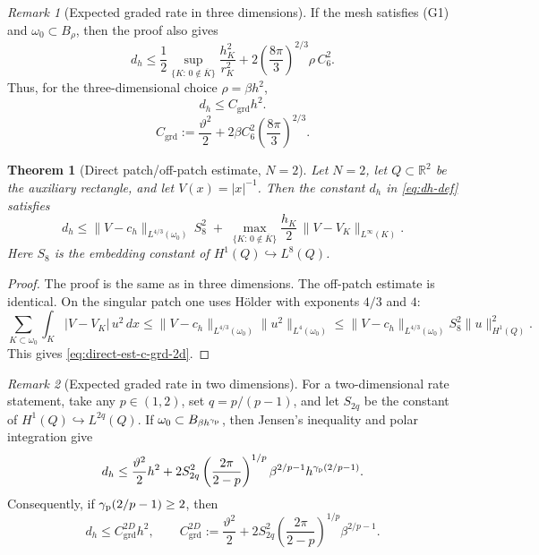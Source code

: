 \documentclass[11pt]{article}
\theoremstyle{plain}
\newtheorem{theorem}{Theorem}
\theoremstyle{definition}
\theoremstyle{remark}
\newtheorem{remark}{Remark}
\begin{document}
\begin{remark}[Expected graded rate in three dimensions]
If the mesh satisfies (G1) and
\(\omega_0\subset B_\rho\), then the proof also gives
\begin{equation}
\label{eq:middle-way}
  d_h
  \le
  \frac12\sup_{\{K:\,0\notin\overline K\}}\frac{h_K^2}{r_K^2}
  +2\left(\frac{8\pi}{3}\right)^{2/3}\rho\,C_6^2 .
\end{equation}
Thus, for the three-dimensional choice \(\rho=\beta h^2\),
\begin{equation}
\label{eq:graded-eps-3d}
  d_h\le C_{\mathrm{grd}}h^2.
\end{equation}
\begin{equation}
\label{eq:Cgrd-3d}
  C_{\mathrm{grd}}
  :=
  \frac{\vartheta^2}{2}
  +2\beta C_6^2\left(\frac{8\pi}{3}\right)^{2/3}.
\end{equation}
\end{remark}

\begin{theorem}[Direct patch/off-patch estimate, $N=2$]
\label{thm:graded-eps-2d}
Let $N=2$, let $Q\subset \mathbb R^2$ be the auxiliary rectangle, and let
$V(x)=|x|^{-1}$. Then the constant $d_h$ in \eqref{eq:dh-def} satisfies
\begin{equation}
d_h
\le
\|V-c_h\|_{L^{4/3}(\omega_0)}\,S_8^2
\;+\;
\max_{\{K:\,0\notin \overline K\}}
\frac{h_K}{2}\,\|V-V_K\|_{L^\infty(K)}.
\label{eq:direct-est-c-grd-2d}
\end{equation}
Here $S_8$ is the embedding constant of
$H^1(Q)\hookrightarrow L^8(Q)$.
\end{theorem}

\begin{proof}
The proof is the same as in three dimensions. The off-patch estimate is
identical. On the singular patch one uses Hölder with exponents
$4/3$ and $4$:
\[
\sum_{K\subset \omega_0}\int_K |V-V_K|\,u^2\,dx
\le
\|V-c_h\|_{L^{4/3}(\omega_0)} \|u^2\|_{L^4(\omega_0)}
\le
\|V-c_h\|_{L^{4/3}(\omega_0)} S_8^2 \|u\|_{H^1(Q)}^2.
\]
This gives \eqref{eq:direct-est-c-grd-2d}.
\end{proof}

\begin{remark}[Expected graded rate in two dimensions]
For a two-dimensional rate statement, take any \(p\in(1,2)\), set
\(q=p/(p-1)\), and let \(S_{2q}\) be the constant of
\(H^1(Q)\hookrightarrow L^{2q}(Q)\).  If
\(\omega_0\subset B_{\beta h^{\gamma_{\rm p}}}\), then Jensen's inequality and
polar integration give
\begin{equation}
\label{eq:graded-eps-2d}
  d_h
  \le
  \frac{\vartheta^2}{2}h^2
  +2S_{2q}^2
  \left(\frac{2\pi}{2-p}\right)^{1/p}
  \beta^{2/p-1}h^{\gamma_{\rm p}(2/p-1)}.
\end{equation}
Consequently, if \(\gamma_{\rm p}(2/p-1)\ge2\), then
\begin{equation}
\label{eq:Cgrd-2d}
  d_h\le C_{\mathrm{grd}}^{2D}h^2,
  \qquad
  C_{\mathrm{grd}}^{2D}
  :=
  \frac{\vartheta^2}{2}
  +2S_{2q}^2
  \left(\frac{2\pi}{2-p}\right)^{1/p}
  \beta^{2/p-1}.
\end{equation}
\end{remark}
\end{document}
